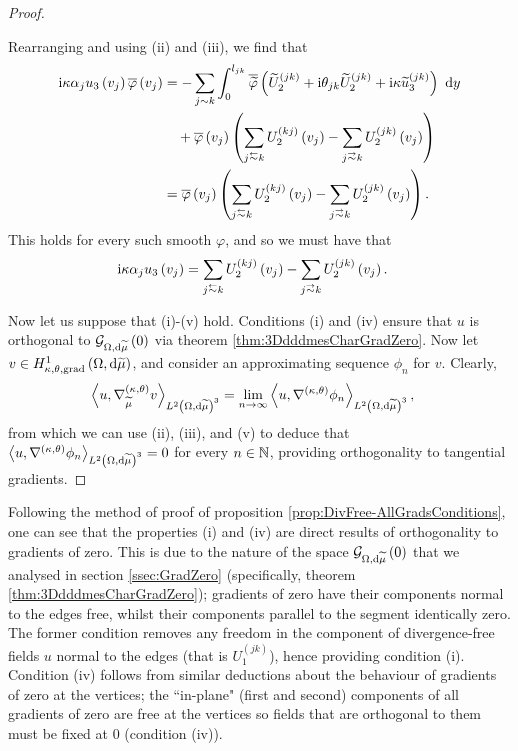 \begin{proof}
\begin{enumerate}[(i)]
		Rearranging and using (ii) and (iii), we find that
		\begin{align*}
			\rmi\wavenumber\alpha_j u_3\bracs{v_j}\overline{\varphi}\bracs{v_j}
			&= - \sum_{j\con k}\int_0^{l_{jk}} \overline{\widetilde{\varphi}}\bracs{ \widetilde{U}_2^{(jk)} + \rmi\qm_{jk}\widetilde{U}_2^{(jk)} + \rmi\wavenumber\widetilde{u}_3^{(jk)} } \ \md y \\
			&\quad + \overline{\varphi}\bracs{v_j}\bracs{ \sum_{j\conRight k} U_2^{(kj)}\bracs{v_j} - \sum_{j\conLeft k} U_2^{(jk)}\bracs{v_j} } \\
			&= \overline{\varphi}\bracs{v_j}\bracs{ \sum_{j\conRight k} U_2^{(kj)}\bracs{v_j} - \sum_{j\conLeft k} U_2^{(jk)}\bracs{v_j} }.
		\end{align*}
		This holds for every such smooth $\varphi$, and so we must have that
		\begin{align*}
			\rmi\wavenumber\alpha_j u_3\bracs{v_j} &= \sum_{j\conRight k} U_2^{(kj)}\bracs{v_j} - \sum_{j\conLeft k} U_2^{(jk)}\bracs{v_j}.
		\end{align*}
	\end{enumerate}
	
	Now let us suppose that (i)-(v) hold.
	Conditions (i) and (iv) ensure that $u$ is orthogonal to $\mathcal{G}_{ \Omega, \mathrm{d}\widetilde{\mu}}\left( 0 \right)$ via theorem \ref{thm:3DdddmesCharGradZero}.
	Now let $v\in H^1_{\kappa,\theta,\mathrm{grad}}\left( \Omega, \mathrm{d}\widetilde{\mu} \right)$, and consider an approximating sequence $\phi_n$ for $v$.
	Clearly,
	\begin{align*}
		\left\langle u , \nabla^{\left( \kappa, \theta \right)}_{\widetilde{\mu}}v \right\rangle_{L^{2}\left( \Omega,\mathrm{d} \widetilde{\mu} \right)^3}
		&= \lim_{n\rightarrow\infty}\left\langle u , \nabla^{\left( \kappa, \theta \right)}\phi_n \right\rangle_{L^{2}\left( \Omega,\mathrm{d} \widetilde{\mu} \right)^3},
	\end{align*}
	from which we can use (ii), (iii), and (v) to deduce that $\left\langle u , \nabla^{\left( \kappa, \theta \right)}\phi_n \right\rangle_{L^{2}\left( \Omega,\mathrm{d} \widetilde{\mu} \right)^3}=0$ for every $n\in\mathbb{N}$, providing orthogonality to tangential gradients.
\end{proof}
Following the method of proof of proposition \ref{prop:DivFree-AllGradsConditions}, one can see that the properties (i) and (iv) are direct results of orthogonality to gradients of zero.
This is due to the nature of the space $\mathcal{G}_{ \Omega, \mathrm{d}\widetilde{\mu}}\left( 0 \right)$ that we analysed in section \ref{ssec:GradZero} (specifically, theorem \ref{thm:3DdddmesCharGradZero}); gradients of zero have their components normal to the edges free, whilst their components parallel to the segment identically zero.
The former condition removes any freedom in the component of divergence-free fields $u$ normal to the edges (that is $U_1^{(jk)}$), hence providing condition (i).
Condition (iv) follows from similar deductions about the behaviour of gradients of zero at the vertices; the ``in-plane" (first and second) components of all gradients of zero are free at the vertices so fields that are orthogonal to them must be fixed at 0 (condition (iv)).

